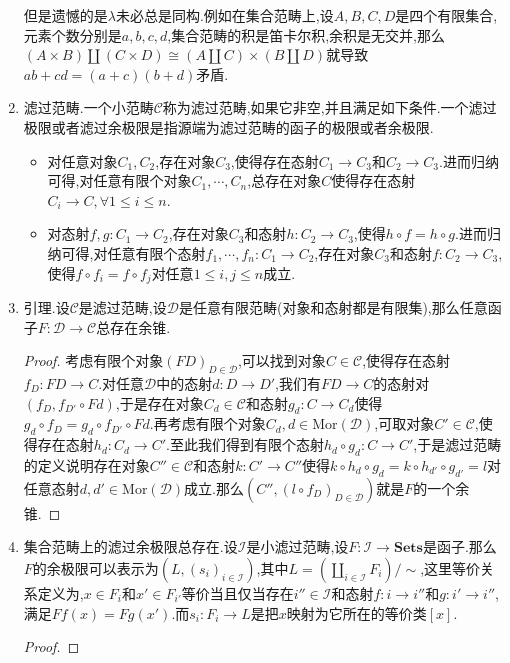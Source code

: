 \begin{enumerate}
    但是遗憾的是$\lambda$未必总是同构.例如在集合范畴上,设$A,B,C,D$是四个有限集合,元素个数分别是$a,b,c,d$,集合范畴的积是笛卡尔积,余积是无交并,那么$(A\times B)\coprod(C\times D)\cong(A\coprod C)\times(B\coprod D)$就导致$ab+cd=(a+c)(b+d)$矛盾.
    \item 滤过范畴.一个小范畴$\mathscr{C}$称为滤过范畴,如果它非空,并且满足如下条件.一个滤过极限或者滤过余极限是指源端为滤过范畴的函子的极限或者余极限.
    \begin{itemize}
    	\item 对任意对象$C_1,C_2$,存在对象$C_3$,使得存在态射$C_1\to C_3$和$C_2\to C_3$.进而归纳可得,对任意有限个对象$C_1,\cdots,C_n$,总存在对象$C$使得存在态射$C_i\to C,\forall 1\le i\le n$.
    	\item 对态射$f,g:C_1\to C_2$,存在对象$C_3$和态射$h:C_2\to C_3$,使得$h\circ f=h\circ g$.进而归纳可得,对任意有限个态射$f_1,\cdots,f_n:C_1\to C_2$,存在对象$C_3$和态射$f:C_2\to C_3$,使得$f\circ f_i=f\circ f_j$对任意$1\le i,j\le n$成立.
    \end{itemize}
    \item 引理.设$\mathscr{C}$是滤过范畴,设$\mathscr{D}$是任意有限范畴(对象和态射都是有限集),那么任意函子$F:\mathscr{D}\to\mathscr{C}$总存在余锥.
    \begin{proof}
    	
    	考虑有限个对象$(FD)_{D\in\mathscr{D}}$,可以找到对象$C\in\mathscr{C}$,使得存在态射$f_D:FD\to C$.对任意$\mathscr{D}$中的态射$d:D\to D'$,我们有$FD\to C$的态射对$(f_D,f_{D'}\circ Fd)$,于是存在对象$C_d\in\mathscr{C}$和态射$g_d:C\to C_d$使得$g_d\circ f_D=g_d\circ f_{D'}\circ Fd$.再考虑有限个对象$C_d,d\in\mathrm{Mor}(\mathscr{D})$,可取对象$C'\in\mathscr{C}$,使得存在态射$h_d:C_d\to C'$.至此我们得到有限个态射$h_d\circ g_d:C\to C'$,于是滤过范畴的定义说明存在对象$C''\in\mathscr{C}$和态射$k:C'\to C''$使得$k\circ h_d\circ g_d=k\circ h_{d'}\circ g_{d'}=l$对任意态射$d,d'\in\mathrm{Mor}(\mathscr{D})$成立.那么$(C'',(l\circ f_D)_{D\in\mathscr{D}})$就是$F$的一个余锥.
    \end{proof}
    \item 集合范畴上的滤过余极限总存在.设$\mathscr{I}$是小滤过范畴,设$F:\mathscr{I}\to\textbf{Sets}$是函子.那么$F$的余极限可以表示为$(L,(s_i)_{i\in\mathscr{I}})$,其中$L=\left(\coprod_{i\in\mathscr{I}}F_i\right)/\sim$,这里等价关系定义为,$x\in F_i$和$x'\in F_{i'}$等价当且仅当存在$i''\in\mathscr{I}$和态射$f:i\to i''$和$g:i'\to i''$,满足$Ff(x)=Fg(x')$.而$s_i:F_i\to L$是把$x$映射为它所在的等价类$[x]$.
    \begin{proof}
    	

\end{proof}
\end{enumerate}
